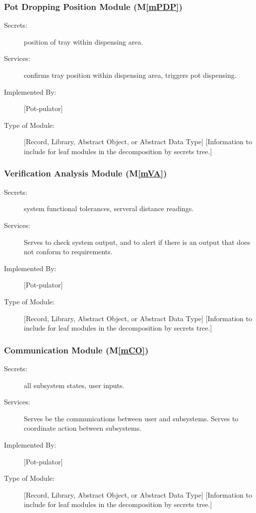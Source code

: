\documentclass[12pt, titlepage]{article}
\newcommand{\mref}[1]{M\ref{#1}}
\begin{document}
\subsubsection{Pot Dropping Position Module (\mref{mPDP})}
\begin{description}
\item[Secrets:] position of tray within dispensing area.
\item[Services:] confirms tray position within dispensing area, triggers pot dispensing.
\item[Implemented By:] [Pot-pulator]
\item[Type of Module:] [Record, Library, Abstract Object, or Abstract Data Type]
  [Information to include for leaf modules in the decomposition by secrets tree.]
\end{description}

\subsubsection{Verification Analysis Module (\mref{mVA})}
\begin{description}
\item[Secrets:] system functional tolerances,  serveral distance readings.
\item[Services:] Serves to check system output, and to alert if there is an output that does not conform to requirements.
\item[Implemented By:] [Pot-pulator]
\item[Type of Module:] [Record, Library, Abstract Object, or Abstract Data Type]
  [Information to include for leaf modules in the decomposition by secrets tree.]
\end{description}

\subsubsection{Communication Module (\mref{mCO})}
\begin{description}
\item[Secrets:] all subsystem states, user inputs.
\item[Services:] Serves be the communications between user and subsystems. Serves to coordinate action between subsystems.
\item[Implemented By:] [Pot-pulator]
\item[Type of Module:] [Record, Library, Abstract Object, or Abstract Data Type]
  [Information to include for leaf modules in the decomposition by secrets tree.]
\end{description}
\end{document}
